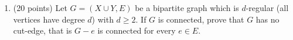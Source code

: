 \documentclass[11pt]{article}
\begin{document}
\begin{enumerate}
\begin{enumerate}
      \end{enumerate}

    \item (20 points) Let \(G = (X \cup Y, E)\) be a bipartite graph which is \(d\)-regular (all vertices have degree \(d\)) with \(d \geq 2\).  If \(G\) is connected, prove that \(G\) has no cut-edge, that is \(G - e\) is connected for every \(e \in E\).
  \end{enumerate}
\end{document}
